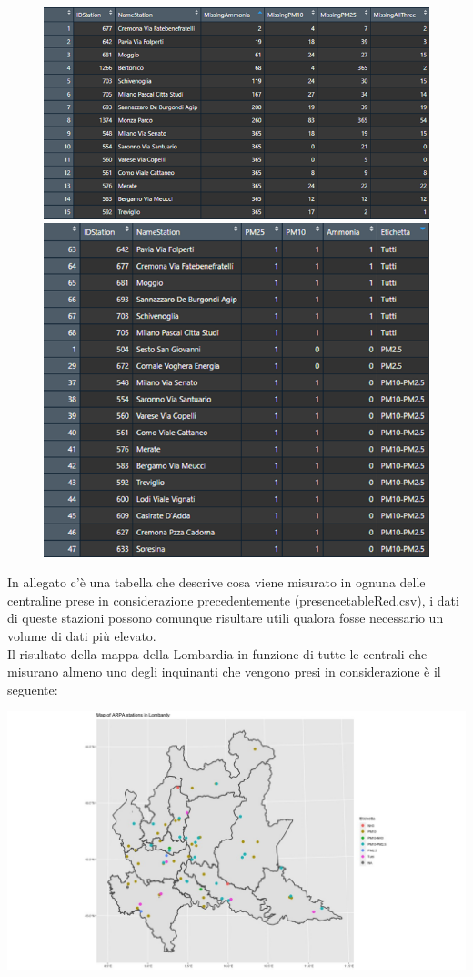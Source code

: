 \documentclass{article}
\begin{document}
\begin{figure}[h!]
  \centering
  \includegraphics[scale=0.75]{Picture/b.png}
  \centering
  \includegraphics[scale=0.65]{Picture/PresenceTable.png}       
\end{figure}

In allegato c'è una tabella che descrive cosa viene misurato in ognuna
delle centraline prese in considerazione precedentemente (presencetableRed.csv), i dati di queste stazioni possono comunque risultare utili qualora fosse necessario un volume di dati più elevato.
\\Il risultato della mappa della Lombardia in funzione di tutte le centrali che misurano almeno uno degli inquinanti che 
vengono presi in considerazione è il seguente:

\includegraphics[scale=0.35]{Picture/mappina.jpeg}
\end{document}
